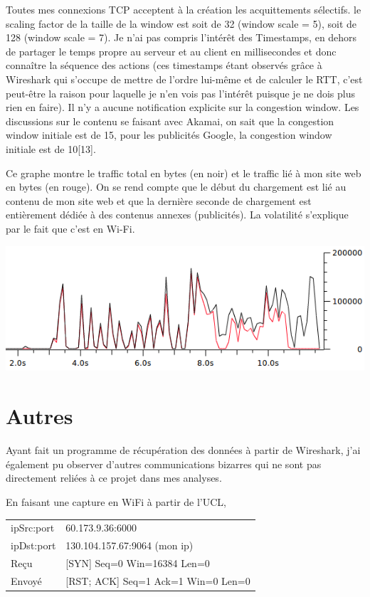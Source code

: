 \documentclass[conference]{IEEEtran}
\begin{document}
Toutes mes connexions TCP acceptent à la création les acquittements sélectifs. le scaling factor de la taille de la window est soit de 32 (window scale = 5), soit de 128 (window scale = 7). Je n'ai pas compris l'intérêt des Timestamps, en dehors de partager le temps propre au serveur et au client en millisecondes et donc connaître la séquence des actions (ces timestamps étant observés grâce à Wireshark qui s'occupe de mettre de l'ordre lui-même et de calculer le RTT, c'est peut-être la raison pour laquelle je n'en vois pas l'intérêt puisque je ne dois plus rien en faire). Il n'y a aucune notification explicite sur la congestion window. Les discussions sur le contenu se faisant avec Akamai, on sait que la congestion window initiale est de 15, pour les publicités Google, la congestion window initiale est de 10[13].

Ce graphe montre le traffic total en bytes (en noir) et le traffic lié à mon site web en bytes (en rouge). On se rend compte que le début du chargement est lié au contenu de mon site web et que la dernière seconde de chargement est entièrement dédiée à des contenus annexes (publicités). La volatilité s'explique par le fait que c'est en Wi-Fi.

\includegraphics[scale=0.4]{tcp.png}

\section{Autres}

Ayant fait un programme de récupération des données à partir de Wireshark, j'ai également pu observer d'autres communications bizarres qui ne sont pas directement reliées à ce projet dans mes analyses. 

En faisant une capture en WiFi à partir de l'UCL, 

\begin{tabular}{|l|l|}
 \hline
 ipSrc:port & 60.173.9.36:6000 \\
 ipDst:port & 130.104.157.67:9064 (mon ip) \\
 Reçu & [SYN] Seq=0 Win=16384 Len=0 \\
 Envoyé & [RST; ACK] Seq=1 Ack=1 Win=0 Len=0 \\
 \hline
\end{tabular}
\end{document}
